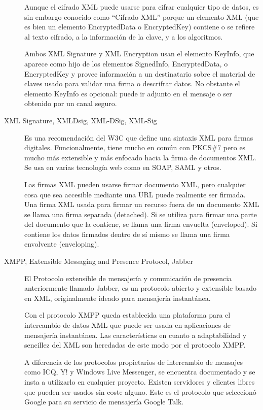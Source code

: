 \begin{description}
Aunque el cifrado XML puede usarse para cifrar cualquier tipo de datos, es sin embargo conocido como ``Cifrado XML'' porque un elemento XML (que es bien un elemento EncryptedData o EncryptedKey) contiene o se refiere al texto cifrado, a la información de la clave, y a los algoritmos.

Ambos XML Signature y XML Encryption usan el elemento KeyInfo, que aparece como hijo de los elementos SignedInfo, EncryptedData, o EncryptedKey y provee información a un destinatario sobre el material de claves usado para validar una firma o descrifrar datos. No obstante el elemento KeyInfo es opcional: puede ir adjunto en el mensaje o ser obtenido por un canal seguro.

\item[XML Signature, XMLDsig, XML-DSig, XML-Sig]

Es una recomendación del W3C que define una sintaxis XML para firmas digitales. Funcionalmente, tiene mucho en común con PKCS\#7 pero es mucho más extensible y más enfocado hacia la firma de documentos XML. Se usa en varias tecnología web como en SOAP, SAML y otros.

Las firmas XML pueden usarse firmar documento XML, pero cualquier cosa que sea accesible mediante una URL puede realmente ser firmada. Una firma XML usada para firmar un recurso fuera de un documento XML se llama una firma separada (detached). Si se utiliza para firmar una parte del documento que la contiene, se llama una firma envuelta (enveloped). Si contiene los datos firmados dentro de sí mismo se llama una firma envolvente (enveloping).

\item[XMPP, Extensible Messaging and Presence Protocol, Jabber]
El Protocolo extensible de mensajería y comunicación de presencia anteriormente llamado Jabber, es un protocolo abierto y extensible basado en XML, originalmente ideado para mensajería instantánea.

Con el protocolo XMPP queda establecida una plataforma para el intercambio de datos XML que puede ser usada en aplicaciones de mensajería instantánea. Las características en cuanto a adaptabilidad y sencillez del XML son heredadas de este modo por el protocolo XMPP.

A diferencia de los protocolos propietarios de intercambio de mensajes como ICQ, Y! y Windows Live Messenger, se encuentra documentado y se insta a utilizarlo en cualquier proyecto. Existen servidores y clientes libres que pueden ser usados sin coste alguno. Este es el protocolo que seleccionó Google para su servicio de mensajería Google Talk.


\end{description}
